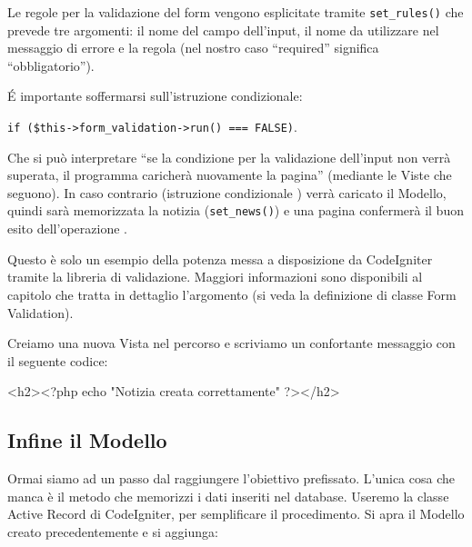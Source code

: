 Le regole per la validazione del form vengono esplicitate tramite \verb|set_rules()| che prevede tre argomenti: il nome del campo dell'input, il nome da utilizzare nel messaggio di errore e la regola (nel nostro caso ``required'' significa ``obbligatorio'').

\'E importante soffermarsi sull'istruzione condizionale: 

\verb|if ($this->form_validation->run() === FALSE)|. 

Che si può interpretare ``se la condizione per la validazione dell'input non verrà superata, il programma caricherà nuovamente la pagina'' (mediante le Viste che seguono). In caso contrario (istruzione condizionale ) verrà caricato il Modello, quindi sarà memorizzata la notizia (\verb|set_news()|) e una pagina confermerà il buon esito dell'operazione .

Questo è solo un esempio della potenza messa a disposizione da CodeIgniter tramite la libreria di validazione. Maggiori informazioni sono disponibili al capitolo che tratta in dettaglio l'argomento (si veda la definizione di classe Form Validation).

Creiamo una nuova Vista  nel percorso  e scriviamo un confortante messaggio con il seguente codice:

\begin{code}
<h2><?php echo "Notizia creata correttamente" ?></h2>
\end{code}

\subsection{Infine il Modello}
Ormai siamo ad un passo dal raggiungere l'obiettivo prefissato. L'unica cosa che manca è il metodo che memorizzi i dati inseriti nel database. Useremo la classe Active Record di CodeIgniter, per semplificare il procedimento. Si apra il Modello creato precedentemente e si aggiunga:


